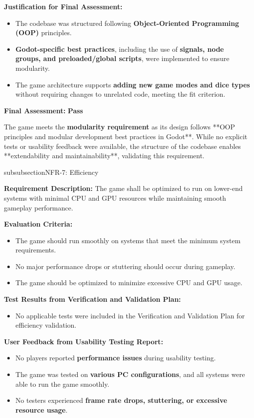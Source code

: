 \documentclass[12pt, titlepage]{article}
\begin{document}
\textbf{Justification for Final Assessment:}  
\begin{itemize}
    \item The codebase was structured following \textbf{Object-Oriented Programming (OOP)} principles.
    \item \textbf{Godot-specific best practices}, including the use of \textbf{signals, node groups, and preloaded/global scripts}, were implemented to ensure modularity.
    \item The game architecture supports \textbf{adding new game modes and dice types} without requiring changes to unrelated code, meeting the fit criterion.
\end{itemize}

\textbf{Final Assessment:} \textbf{Pass}  

The game meets the \textbf{modularity requirement} as its design follows **OOP principles and modular development best practices in Godot**. While no explicit tests or usability feedback were available, the structure of the codebase enables **extendability and maintainability**, validating this requirement.


\*subsubsection{NFR-7: Efficiency}

\textbf{Requirement Description:}  
The game shall be optimized to run on lower-end systems with minimal CPU and GPU resources while maintaining smooth gameplay performance.

\textbf{Evaluation Criteria:}  
\begin{itemize}
    \item The game should run smoothly on systems that meet the minimum system requirements.
    \item No major performance drops or stuttering should occur during gameplay.
    \item The game should be optimized to minimize excessive CPU and GPU usage.
\end{itemize}

\textbf{Test Results from Verification and Validation Plan:}  
\begin{itemize}
    \item No applicable tests were included in the Verification and Validation Plan for efficiency validation.
\end{itemize}

\textbf{User Feedback from Usability Testing Report:}  
\begin{itemize}
    \item No players reported \textbf{performance issues} during usability testing.
    \item The game was tested on \textbf{various PC configurations}, and all systems were able to run the game smoothly.
    \item No testers experienced \textbf{frame rate drops, stuttering, or excessive resource usage}.
\end{itemize}
\end{document}
